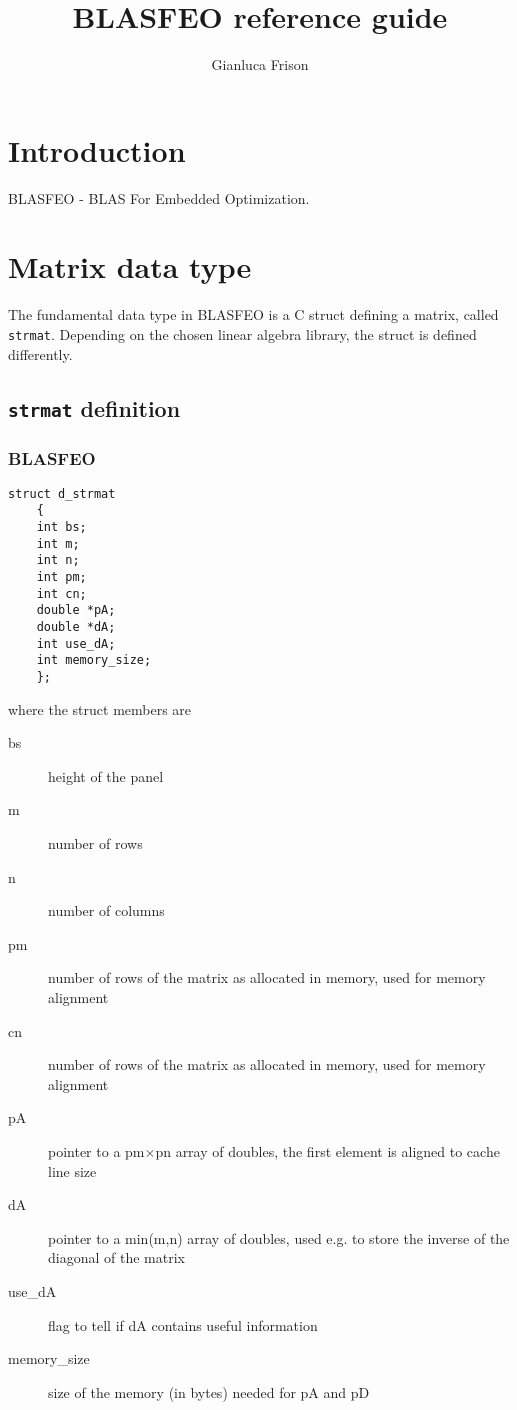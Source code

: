 \documentclass[a4paper]{report}
\title{BLASFEO reference guide}
\author{Gianluca Frison}
\begin{document}
\maketitle
\tableofcontents





\chapter{Introduction}

BLASFEO - BLAS For Embedded Optimization.





\chapter{Matrix data type}

The fundamental data type in BLASFEO is a C struct defining a matrix, called {\tt strmat}.
Depending on the chosen linear algebra library, the struct is defined differently.



\section{{\tt strmat} definition}


\subsection{BLASFEO}

\begin{verbatim}
struct d_strmat 
	{
	int bs;
	int m;
	int n;
	int pm;
	int cn;
	double *pA;
	double *dA;
	int use_dA;
	int memory_size;
	};
\end{verbatim}
where the struct members are
\begin{description}
\item[bs] height of the panel
\item[m] number of rows
\item[n] number of columns
\item[pm] number of rows of the matrix as allocated in memory, used for memory alignment
\item[cn] number of rows of the matrix as allocated in memory, used for memory alignment
\item[pA] pointer to a pm$\times$pn array of doubles, the first element is aligned to cache line size
\item[dA] pointer to a min(m,n) array of doubles, used e.g. to store the inverse of the diagonal of the matrix
\item[use\_dA] flag to tell if dA contains useful information
\item[memory\_size] size of the memory (in bytes) needed for pA and pD
\end{description}
\end{document}
